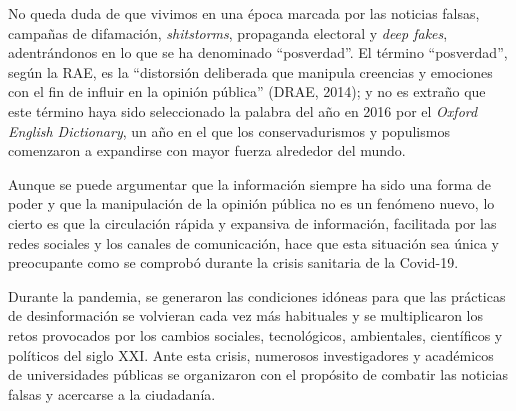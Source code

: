 \documentclass[
  spanish,
  11pt,
  a4paper,
]{scrbook}
\begin{document}
No queda duda de que vivimos en una época marcada por las noticias
falsas, campañas de difamación, \emph{shitstorms}, propaganda electoral
y \emph{deep fakes}, adentrándonos en lo que se ha denominado
``posverdad''. El término ``posverdad'', según la RAE, es la
``distorsión deliberada que manipula creencias y emociones con el fin de
influir en la opinión pública'' (DRAE, 2014); y no es extraño que este
término haya sido seleccionado la palabra del año en 2016 por el
\emph{Oxford English Dictionary}, un año en el que los conservadurismos
y populismos comenzaron a expandirse con mayor fuerza alrededor del
mundo.

Aunque se puede argumentar que la información siempre ha sido una forma
de poder y que la manipulación de la opinión pública no es un fenómeno
nuevo, lo cierto es que la circulación rápida y expansiva de
información, facilitada por las redes sociales y los canales de
comunicación, hace que esta situación sea única y preocupante como se
comprobó durante la crisis sanitaria de la Covid-19.

Durante la pandemia, se generaron las condiciones idóneas para que las
prácticas de desinformación se volvieran cada vez más habituales y se
multiplicaron los retos provocados por los cambios sociales,
tecnológicos, ambientales, científicos y políticos del siglo XXI. Ante
esta crisis, numerosos investigadores y académicos de universidades
públicas se organizaron con el propósito de combatir las noticias falsas
y acercarse a la ciudadanía.
\end{document}
